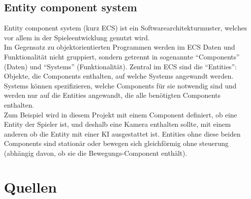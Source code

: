 \documentclass[a4paper,titlepage]{article}
\begin{document}
    \subsection{Entity component system}
    
    Entity component system (kurz ECS) ist ein Softwarearchitekturmuster, welches vor allem in der Spieleentwicklung genutzt wird.\\
    Im Gegensatz zu objektorientierten Programmen werden im ECS Daten und Funktionalität nicht gruppiert, sondern getrennt in sogenannte ``Components'' (Daten) und ``Systems'' (Funktionalität).
    Zentral im ECS sind die ``Entities'': Objekte, die Components enthalten, auf welche Systems angewandt werden.\\
    Systems können spezifizieren, welche Components für sie notwendig sind und werden nur auf die Entities angewandt, die alle benötigten Components enthalten.\\
    Zum Beispiel wird in diesem Projekt mit einem Component definiert, ob eine Entity der Spieler ist, und deshalb eine Kamera enthalten sollte, mit einem anderen ob die Entity mit einer KI ausgestattet ist. Entities ohne diese beiden Components sind stationär oder bewegen sich gleichförmig ohne steuerung (abhängig davon, ob sie die Bewegungs-Component enthält).
    
    
    \newpage
    
    \section{Quellen}
    
\end{document}
